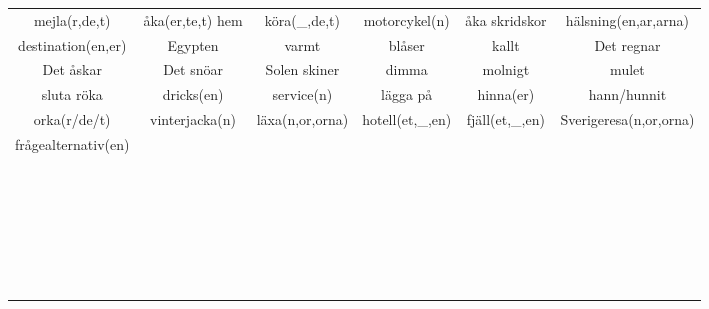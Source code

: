 \begin{center}
\begin{adjustwidth}{-2.5cm}{}
\begin{tabular}{|c c c c c c|}
            mejla(r,de,t) & åka(er,te,t) hem & köra(\_,de,t) & motorcykel(n) & åka skridskor & hälsning(en,ar,arna) \\
            destination(en,er) & Egypten & varmt & blåser & kallt & Det regnar \\
            Det åskar & Det snöar & Solen skiner & dimma & molnigt & mulet \\
            sluta röka & dricks(en) & service(n) & lägga på & hinna(er) & hann/hunnit \\
            orka(r/de/t) & vinterjacka(n) & läxa(n,or,orna) & hotell(et,\_,en) & fjäll(et,\_,en) & Sverigeresa(n,or,orna) \\
            frågealternativ(en) &  &  &  &  &  \\
             &  &  &  &  &  \\
             &  &  &  &  &  \\
             &  &  &  &  &  \\
             &  &  &  &  &  \\
             &  &  &  &  &  \\
             &  &  &  &  &  \\
             &  &  &  &  &  \\
             &  &  &  &  &  \\
             &  &  &  &  &  \\
             &  &  &  &  &  \\
             &  &  &  &  &  \\
             &  &  &  &  &  \\
             &  &  &  &  &  \\
             &  &  &  &  &  \\
             &  &  &  &  &  \\
             &  &  &  &  &  \\
             &  &  &  &  &  \\
             &  &  &  &  &  \\
             &  &  &  &  &  \\
             &  &  &  &  &  \\
             &  &  &  &  &  \\
             &  &  &  &  &  \\
             &  &  &  &  &  \\
             &  &  &  &  &  \\
             &  &  &  &  &  \\
             &  &  &  &  &  \\
             &  &  &  &  &  \\
            \hline
        \end{tabular}
    \end{adjustwidth}
\end{center}

